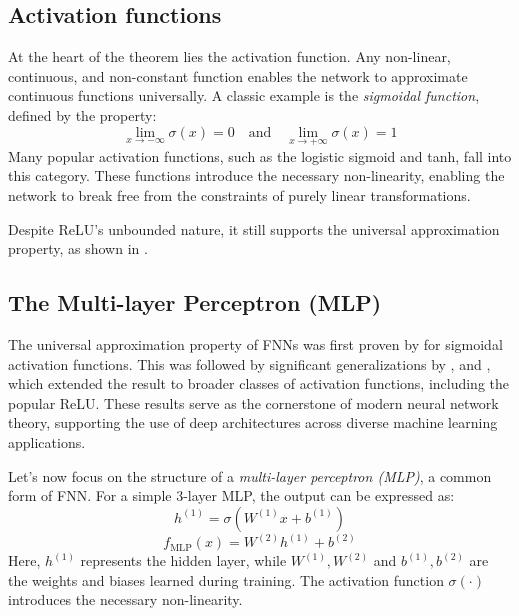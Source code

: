 \documentclass{article}
\theoremstyle{definition}
\theoremstyle{remark}
\newcounter{ct}
\begin{document}
\subsection{Activation functions} %
At the heart of the theorem lies the activation function. Any non-linear, continuous, and non-constant function enables the network to approximate continuous functions universally.
A classic example is the \textit{sigmoidal function}, defined by the property:
\[
\lim_{x \to -\infty} \sigma(x) = 0 \quad \text{and} \quad \lim_{x \to +\infty} \sigma(x) = 1
\]
Many popular activation functions, such as the logistic sigmoid and tanh, fall into this category.
These functions introduce the necessary non-linearity, enabling the network to break free from the constraints of purely linear transformations.

Despite ReLU's unbounded nature, it still supports the universal approximation property, as shown in \citep{yarotsky2017error}.



\subsection{The Multi-layer Perceptron (MLP)}

The universal approximation property of FNNs was first proven by \citep{cybenko1989approximation} for sigmoidal activation functions. This was followed by significant generalizations by \citep{hornik1989multilayer}, \citep{funahashi1989approximate} and \citep{hechtnielsen1992backpropagation}, which extended the result to broader classes of activation functions, including the popular ReLU.
These results serve as the cornerstone of modern neural network theory, supporting the use of deep architectures across diverse machine learning applications.



Let’s now focus on the structure of a \textit{multi-layer perceptron (MLP)}, a common form of FNN. For a simple 3-layer MLP, the output can be expressed as:
\[
h^{(1)} = \sigma(W^{(1)} x + b^{(1)})
\]
\[
f_{\text{MLP}}(x) = W^{(2)} h^{(1)} + b^{(2)}
\]
Here, \(h^{(1)}\) represents the hidden layer, while \(W^{(1)}, W^{(2)}\) and \(b^{(1)}, b^{(2)}\) are the weights and biases learned during training. The activation function \(\sigma(\cdot)\) introduces the necessary non-linearity.
\end{document}
